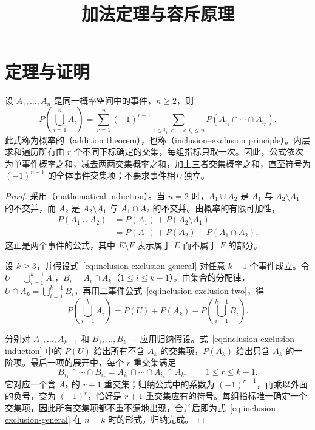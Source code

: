 \documentclass[UTF8]{ctexart}
\title{加法定理与容斥原理}
\author{}
\date{}
\begin{document}
\maketitle

\section{定理与证明}
\label{sec:inclusion-exclusion-theorem-proof}

\begin{theorem}[加法定理]
\label{thm:inclusion-exclusion}
设 $A_1,\ldots,A_n$ 是同一概率空间中的事件，$n\ge2$，则
\begin{equation}
  P\left(\bigcup_{i=1}^{n}A_i\right)
  =\sum_{r=1}^{n}(-1)^{r-1}
    \sum_{1\le i_1<\cdots<i_r\le n}
    P\left(A_{i_1}\cap\cdots\cap A_{i_r}\right).
  \label{eq:inclusion-exclusion-general}
\end{equation}
此式称为概率的（addition theorem），也称（inclusion--exclusion principle）。内层求和遍历所有由 $r$ 个不同下标确定的交集，每组指标只取一次。因此，公式依次为单事件概率之和，减去两两交集概率之和，加上三者交集概率之和，直至符号为 $(-1)^{n-1}$ 的全体事件交集项；不要求事件相互独立。
\end{theorem}

\begin{proof}
采用（mathematical induction）。当 $n=2$ 时，$A_1\cup A_2$ 是 $A_1$ 与 $A_2\setminus A_1$ 的不交并，而 $A_2$ 是 $A_2\setminus A_1$ 与 $A_1\cap A_2$ 的不交并。由概率的有限可加性，
\begin{equation}
  \begin{aligned}
    P(A_1\cup A_2)
    &=P(A_1)+P(A_2\setminus A_1)\\
    &=P(A_1)+P(A_2)-P(A_1\cap A_2).
  \end{aligned}
  \label{eq:inclusion-exclusion-two}
\end{equation}
这正是两个事件的公式，其中 $E\setminus F$ 表示属于 $E$ 而不属于 $F$ 的部分。

设 $k\ge3$，并假设式~\eqref{eq:inclusion-exclusion-general} 对任意 $k-1$ 个事件成立。令 $U=\bigcup_{i=1}^{k-1}A_i$，$B_i=A_i\cap A_k$（$1\le i\le k-1$）。由集合的分配律，$U\cap A_k=\bigcup_{i=1}^{k-1}B_i$，再用二事件公式~\eqref{eq:inclusion-exclusion-two}，得
\begin{equation}
  P\left(\bigcup_{i=1}^{k}A_i\right)
  =P(U)+P(A_k)-P\left(\bigcup_{i=1}^{k-1}B_i\right).
  \label{eq:inclusion-exclusion-induction}
\end{equation}

分别对 $A_1,\ldots,A_{k-1}$ 和 $B_1,\ldots,B_{k-1}$ 应用归纳假设。式~\eqref{eq:inclusion-exclusion-induction} 中的 $P(U)$ 给出所有不含 $A_k$ 的交集项，$P(A_k)$ 给出只含 $A_k$ 的一阶项。最后一项的展开中，每个 $r$ 重交集满足
\[
  B_{i_1}\cap\cdots\cap B_{i_r}
  =A_{i_1}\cap\cdots\cap A_{i_r}\cap A_k,
  \qquad 1\le r\le k-1.
\]
它对应一个含 $A_k$ 的 $r+1$ 重交集；归纳公式中的系数为 $(-1)^{r-1}$，再乘以外面的负号，变为 $(-1)^r$，恰好是 $r+1$ 重交集应有的符号。每组指标唯一确定一个交集项，因此所有交集项都不重不漏地出现，合并后即为式~\eqref{eq:inclusion-exclusion-general} 在 $n=k$ 时的形式。归纳完成。
\end{proof}
\end{document}
